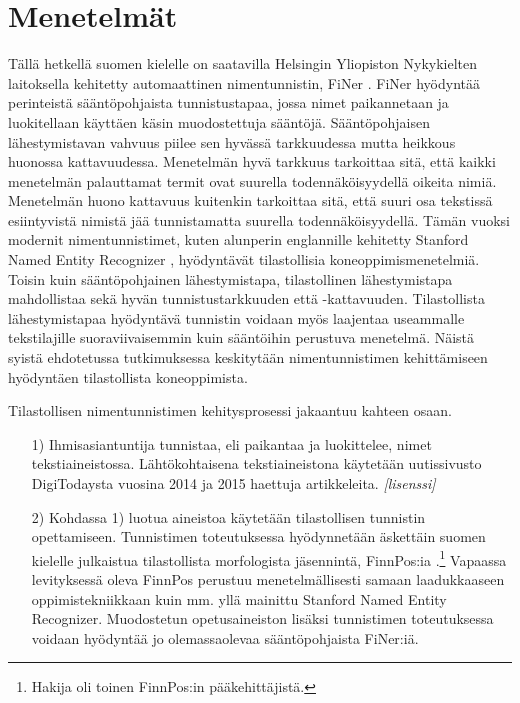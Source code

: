 \documentclass[12pt,a4paper,finnish,oneside]{article}
\newcommand{\fixme}[1]{\textsl{[#1]}}
\begin{document}
\section{Menetelmät}

Tällä hetkellä suomen kielelle on saatavilla Helsingin Yliopiston Nykykielten laitoksella kehitetty automaattinen nimentunnistin, FiNer \cite{}. FiNer hyödyntää perinteistä sääntöpohjaista tunnistustapaa, jossa nimet paikannetaan ja luokitellaan käyttäen käsin muodostettuja sääntöjä. Sääntöpohjaisen lähestymistavan vahvuus piilee sen hyvässä tarkkuudessa mutta heikkous huonossa kattavuudessa. Menetelmän hyvä tarkkuus tarkoittaa sitä, että kaikki menetelmän palauttamat termit ovat suurella todennäköisyydellä oikeita nimiä. Menetelmän huono kattavuus kuitenkin tarkoittaa sitä, että suuri osa tekstissä esiintyvistä nimistä jää tunnistamatta suurella todennäköisyydellä. Tämän vuoksi modernit nimentunnistimet, kuten alunperin englannille kehitetty Stanford Named Entity Recognizer \cite{stanfordner}, hyödyntävät tilastollisia koneoppimismenetelmiä. Toisin kuin sääntöpohjainen lähestymistapa, tilastollinen lähestymistapa mahdollistaa sekä hyvän tunnistustarkkuuden että -kattavuuden. Tilastollista lähestymistapaa hyödyntävä tunnistin voidaan myös laajentaa useammalle tekstilajille suoraviivaisemmin kuin sääntöihin perustuva menetelmä. Näistä syistä ehdotetussa tutkimuksessa keskitytään nimentunnistimen kehittämiseen hyödyntäen tilastollista koneoppimista.

Tilastollisen nimentunnistimen kehitysprosessi jakaantuu kahteen osaan. 

\begin{itemize}

\item[1)] Ihmisasiantuntija tunnistaa, eli paikantaa ja luokittelee, nimet tekstiaineistossa. Lähtökohtaisena tekstiaineistona käytetään uutissivusto DigiTodaysta vuosina 2014 ja 2015 haettuja artikkeleita. \fixme{lisenssi}

\item[2)] Kohdassa 1) luotua aineistoa käytetään tilastollisen tunnistin opettamiseen. Tunnistimen toteutuksessa hyödynnetään äskettäin suomen kielelle julkaistua tilastollista morfologista jäsennintä, FinnPos:ia \cite{silfverberg2015}\cite{finnpos}.\footnote{Hakija oli toinen FinnPos:in pääkehittäjistä.} Vapaassa levityksessä oleva FinnPos perustuu menetelmällisesti samaan laadukkaaseen oppimistekniikkaan kuin mm. yllä mainittu Stanford Named Entity Recognizer. Muodostetun opetusaineiston lisäksi tunnistimen toteutuksessa voidaan hyödyntää jo olemassaolevaa sääntöpohjaista FiNer:iä.

\end{itemize}
\end{document}
